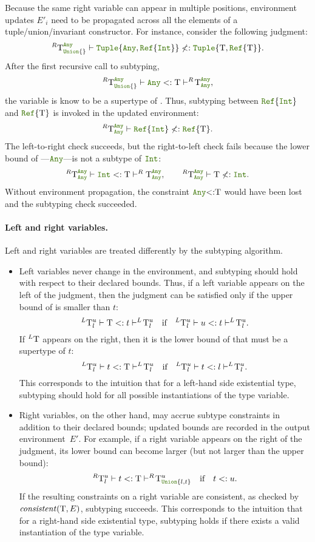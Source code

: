 Because the same right variable can appear in multiple positions, environment
updates $E'_i$ need to be propagated across all the elements of
a tuple/union/invariant constructor.
For instance, consider the following judgment:
\[ 
  ^R \T_{\uniontyp{}}^{\anytyp} \vdash 
  \tupletyp{\anytyp, \reftyp{\inttyp}} \nless: \tupletyp{\T, \reftyp{\T}}.
\]
After the first recursive call to subtyping,
\[ 
  ^R \T_{\uniontyp{}}^{\anytyp} \vdash \anytyp <: \T 
  \vdash ^R\!\T_{\anytyp}^{\anytyp},
\]
the variable \T is know to be a supertype of \anytyp.
Thus, subtyping between $\reftyp{\inttyp}$ and $\reftyp{\T}$ is invoked
in the updated environment:
\[ 
  ^R \T_{\anytyp}^{\anytyp} \vdash 
  \reftyp{\inttyp} \nless: \reftyp{\T}.
\]
The left-to-right check succeeds, but the right-to-left check fails because
the lower bound of \T---$\anytyp$---is not a subtype of $\inttyp$:
\[ 
  ^R \T_{\anytyp}^{\anytyp} \vdash \inttyp <: \T \vdash ^R \T_{\anytyp}^{\anytyp},
  \qquad 
  ^R \T_{\anytyp}^{\anytyp} \vdash \T \nless: \inttyp.
\]
Without environment propagation, the constraint $\anytyp{<:}\T$ would have been
lost and the subtyping check succeeded.

\paragraph{Left and right variables.}
Left and right variables are treated differently by the subtyping algorithm.
\begin{itemize}
  \item Left variables never change in the environment, and subtyping should
  hold with respect to their declared bounds.
  Thus, if a left variable \T appears on the
  left of the judgment, then the judgment can be satisfied
  only if the upper bound of \T is smaller than $t$:
  \[ ^L \T_l^u \vdash \T <: t \vdash ^L\! \T_l^u\ \ \text{ if }\ \ 
     ^L \T_l^u \vdash u <: t \vdash ^L\!\T_l^u. \]
  If $^L \mathrm{T}$ appears on the right, then
  it is the lower bound of \T that must be a supertype of $t$:
  \[ ^L \T_l^u \vdash t <: \T \vdash ^L\! \T_l^u \ \ \text{ if }\ \ 
     ^L \T_l^u \vdash t <: l \vdash ^L\!\T_l^u. \]
  This corresponds to the intuition that for a left-hand side existential type,
  subtyping should hold for all possible instantiations of the type variable.
  \item Right variables, on the other hand, may accrue subtype constraints
  in addition to their declared bounds;
  updated bounds are recorded in the output environment~$E'$.
  For example, if a right variable \T appears on the right of the judgment,
  its lower bound can become larger (but not larger than the upper bound):
  \[ ^R \T_l^u \vdash \t <: \T \vdash ^R\!\T_{\uniontyp{l, t}}^u \ \ \text{ if }\ \ 
     \t <:u. \]
  If the resulting constraints on a right variable are consistent,
  as checked by $\mathit{consistent}(\mathrm{T}, E)$, subtyping succeeds.
  This corresponds to the intuition that
  for a right-hand side existential type, subtyping holds
  if there exists a valid instantiation of the type variable.  
\end{itemize}

